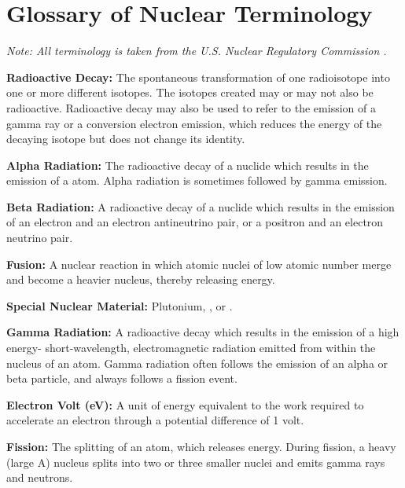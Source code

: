 \documentclass{report}
\begin{document}






\appendix
\chapter[Appendix A: Glossary of Nuclear Terminology]{Glossary of Nuclear Terminology}  \label{app:glossary}



\textit{Note: All terminology is taken from the U.S. Nuclear Regulatory Commission  \cite{USNRC2015}.}

\textbf{Radioactive Decay:} The spontaneous transformation of one radioisotope into one or more different isotopes. The isotopes created may or may not also be radioactive. Radioactive decay may also be used to refer to the emission of a gamma ray or a conversion electron emission, which reduces the energy of the decaying isotope but does not change its identity. 

\textbf{Alpha Radiation:} The radioactive decay of a nuclide which results in the emission of a  atom. Alpha radiation is sometimes followed by gamma emission. 

\textbf{Beta Radiation:} A radioactive decay of a nuclide which results in the emission of an electron and an electron antineutrino pair, or a positron and an electron neutrino pair. 

\textbf{Fusion:} A nuclear reaction in which atomic nuclei of low atomic number merge and become a heavier nucleus, thereby releasing energy. 

\textbf{Special Nuclear Material:} Plutonium, ,  or .

\textbf{Gamma Radiation:} A radioactive decay which results in the emission of a high energy- short-wavelength, electromagnetic radiation emitted from within the nucleus of an atom. Gamma radiation often follows the emission of an alpha or beta particle, and always follows a fission event. 

\textbf{Electron Volt (eV):} A unit of energy equivalent to the work required to accelerate an electron through a potential difference of 1 volt. 

\textbf{Fission:} The splitting of an atom, which releases energy. During fission, a heavy (large A) nucleus splits into two or three smaller nuclei and emits gamma rays and neutrons. 
\end{document}
